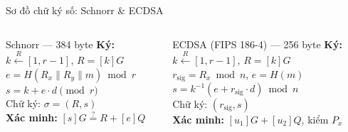 \begin{frame}{Sơ đồ chữ ký số: Schnorr \& ECDSA}
  \begin{columns}[t]
      \begin{block}{Schnorr --- 384 byte}
        \small
        \textbf{Ký:} $k \xleftarrow{R} [1,r{-}1]$, $R=[k]G$\\
        $e = H(R_x \| R_y \| m) \bmod r$\\
        $s = k + e \cdot d \pmod{r}$\\
        Chữ ký: $\sigma = (R, s)$\\[4pt]
        \textbf{Xác minh:} $[s]G \stackrel{?}{=} R + [e]Q$
      \end{block}
      \begin{block}{ECDSA (FIPS 186-4) --- 256 byte}
        \small
        \textbf{Ký:} $k \xleftarrow{R} [1,r{-}1]$, $R=[k]G$\\
        $r_{\text{sig}} = R_x \bmod n$, $e = H(m)$\\
        $s = k^{-1}(e + r_{\text{sig}} \cdot d) \bmod n$\\
        Chữ ký: $(r_{\text{sig}}, s)$\\[4pt]
        \textbf{Xác minh:} $[u_1]G + [u_2]Q$, kiểm $P_x$
      \end{block}
  \end{columns}
\end{frame}
